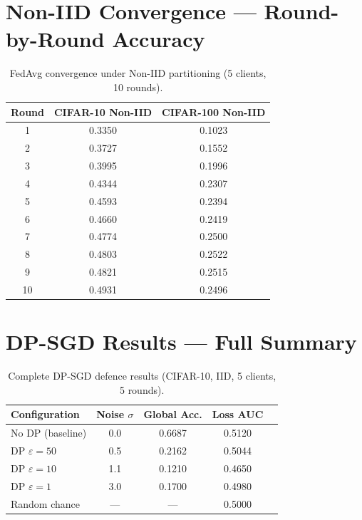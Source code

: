 \documentclass[12pt, a4paper]{report}
\begin{document}
\section{Non-IID Convergence --- Round-by-Round Accuracy}
\begin{table}[H]
  \centering
  \caption{FedAvg convergence under Non-IID partitioning (5 clients, 10 rounds).}
  \begin{tabular}{ccc}
    \toprule
    \textbf{Round} & \textbf{CIFAR-10 Non-IID} & \textbf{CIFAR-100 Non-IID} \\
    \midrule
    1  & 0.3350 & 0.1023 \\
    2  & 0.3727 & 0.1552 \\
    3  & 0.3995 & 0.1996 \\
    4  & 0.4344 & 0.2307 \\
    5  & 0.4593 & 0.2394 \\
    6  & 0.4660 & 0.2419 \\
    7  & 0.4774 & 0.2500 \\
    8  & 0.4803 & 0.2522 \\
    9  & 0.4821 & 0.2515 \\
    10 & 0.4931 & 0.2496 \\
    \bottomrule
  \end{tabular}
\end{table}

\section{DP-SGD Results --- Full Summary}
\begin{table}[H]
  \centering
  \caption{Complete DP-SGD defence results (CIFAR-10, IID, 5 clients, 5 rounds).}
  \begin{tabular}{lcccc}
    \toprule
    \textbf{Configuration} & \textbf{Noise $\sigma$} & \textbf{Global Acc.} & \textbf{Loss AUC} \\
    \midrule
    No DP (baseline) & 0.0 & 0.6687 & 0.5120 \\
    DP $\varepsilon=50$ & 0.5 & 0.2162 & 0.5044 \\

    DP $\varepsilon=10$ & 1.1 & 0.1210 & 0.4650 \\

    DP $\varepsilon=1$  & 3.0 & 0.1700 & 0.4980 \\

    \midrule
    Random chance       & ---      & ---    & 0.5000 \\
    \bottomrule
  \end{tabular}
\end{table}
\end{document}

